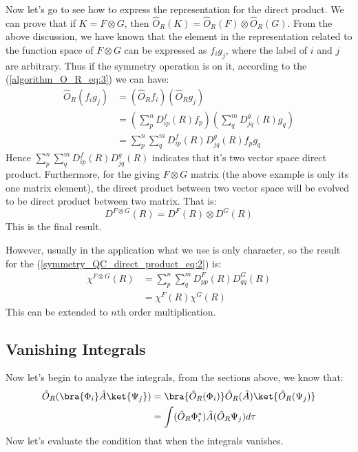Now let's go to see how to express the representation for the direct
product. We can prove that if $K = F\otimes G$, then $\hat{O}_{R} (K)
= \hat{O}_{R}(F)\otimes \hat{O}_{R}(G)$. From the above discussion, we have
known that the element in the representation related to the function space
of $F\otimes G$ can be expressed as $f_{i}g_{j}$, where the label of
$i$ and $j$ are arbitrary. Thus if the symmetry operation is on it,
according to the (\ref{algorithm_O_R_eq:3}) we can have:
\begin{align}\label{}
  \hat{O}_{R}(f_{i}g_{j}) &= (\hat{O}_{R}f_{i})(\hat{O}_{R}g_{j})
  \nonumber \\
  &=(\sum_{p}^{n}D^{f}_{ip}(R)f_{p})(\sum_{q}^{m}D^{g}_{jq}(R)g_{q})
  \nonumber \\
  &=\sum_{p}^{n}\sum_{q}^{m}D^{f}_{ip}(R)D^{g}_{jq}(R)f_{p}g_{q}
\label{symmetry_QC_direct_product_eq:1}
\end{align}
Hence $\sum_{p}^{n}\sum_{q}^{m}D^{f}_{ip}(R)D^{g}_{jq}(R)$ indicates that it's
two vector space direct product. Furthermore, for the giving $F\otimes G$ matrix
(the above example is only its one matrix element), the direct product between
two vector space will be evolved to be direct product between two matrix. That
is:
\begin{equation}
   D^{F \otimes G}(R) = D^{F}(R)\otimes D^{G}(R)
\label{symmetry_QC_direct_product_eq:2}
\end{equation}
This is the final result. 

However, usually in the application what we use is only character, so the
result for the (\ref{symmetry_QC_direct_product_eq:2}) is:
\begin{align}\label{symmetry_QC_direct_product_eq:3}
  \chi^{F\otimes G}(R) &=
  \sum_{p}^{n}\sum_{q}^{m}D^{F}_{pp}(R)D^{G}_{qq}(R) \nonumber \\
  &=\chi^{F}(R)\chi^{G}(R)
\end{align}
This can be extended to $n$th order multiplication.

\subsection{Vanishing Integrals}
%
%
Now let's begin to analyze the integrals, from the sections above, we know
that: 
\begin{align}\label{vanishing_int}
  \hat{O}_{R}(\bra{\Phi_{i}}\hat{A}\ket{\Psi_{j}}) &=
\bra{\hat{O}_{R}(\Phi_{i})}\hat{O}_{R}(\hat{A})\ket{\hat{O}_{R}(\Psi_{j})}
\nonumber \\
&= \int(\hat{O}_{R}\Phi^{*}_{i})\hat{A}(\hat{O}_{R}\Psi_{j})d\tau
\end{align}
Now let's evaluate the condition that when the integrals vanishes.

